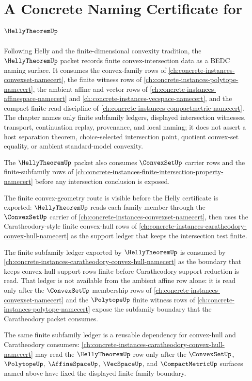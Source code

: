 \chapter{A Concrete Naming Certificate for $\HellyTheoremUp$}
\label{ch:concrete-instances-helly-theorem-namecert}

Following Helly and the finite-dimensional convexity tradition, the $\HellyTheoremUp$ packet records finite convex-intersection data as a BEDC naming surface. It consumes the convex-family rows of \autoref{ch:concrete-instances-convexset-namecert}, the finite witness rows of \autoref{ch:concrete-instances-polytope-namecert}, the ambient affine and vector rows of \autoref{ch:concrete-instances-affinespace-namecert} and \autoref{ch:concrete-instances-vecspace-namecert}, and the compact finite-read discipline of \autoref{ch:concrete-instances-compactmetric-namecert}. The chapter names only finite subfamily ledgers, displayed intersection witnesses, transport, continuation replay, provenance, and local naming; it does not assert a host separation theorem, choice-selected intersection point, quotient convex-set equality, or ambient standard-model convexity.

The $\HellyTheoremUp$ packet also consumes $\ConvexSetUp$ carrier rows and the finite-subfamily rows of \autoref{ch:concrete-instances-finite-intersection-property-namecert} before any intersection conclusion is exposed.

The finite convex-geometry route is visible before the Helly certificate is exported: $\HellyTheoremUp$ reads each family member through the $\ConvexSetUp$ carrier of \autoref{ch:concrete-instances-convexset-namecert}, then uses the Caratheodory-style finite convex-hull rows of \autoref{ch:concrete-instances-caratheodory-convex-hull-namecert} as the support ledger that keeps the intersection test finite.

The finite subfamily ledger exported by $\HellyTheoremUp$ is consumed by \autoref{ch:concrete-instances-caratheodory-convex-hull-namecert} as the boundary that keeps convex-hull support rows finite before Caratheodory support reduction is read. That ledger is not available from the ambient affine row alone: it is read only after the $\ConvexSetUp$ membership rows of \autoref{ch:concrete-instances-convexset-namecert} and the $\PolytopeUp$ finite witness rows of \autoref{ch:concrete-instances-polytope-namecert} expose the subfamily boundary that the Caratheodory packet consumes.

The same finite subfamily ledger is a reusable dependency for convex-hull and Caratheodory consumers: \autoref{ch:concrete-instances-caratheodory-convex-hull-namecert} may read the $\HellyTheoremUp$ row only after the $\ConvexSetUp$, $\PolytopeUp$, $\AffineSpaceUp$, $\VecSpaceUp$, and $\CompactMetricUp$ surfaces named above have fixed the displayed finite family boundary.

